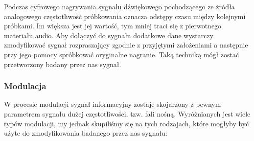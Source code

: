 \documentclass[a4paper,titleauthor]{mwart}
\begin{document}
Podczas cyfrowego nagrywania sygnału dźwiękowego pochodzącego ze źródła analogowego częstotliwość próbkowania oznacza odstępy czasu między kolejnymi próbkami. Im większa jest jej wartość, tym mniej traci się z pierwotnego materiału audio. Aby dołączyć do sygnału dodatkowe dane wystarczy zmodyfikować sygnał rozpraszający zgodnie z przyjętymi założeniami a następnie przy jego pomocy spróbkować oryginalne nagranie. Taką techniką mógł zostać przetworzony badany przez nas sygnał. 

\subsubsection{Modulacja}

W procesie modulacji sygnał informacyjny zostaje skojarzony z pewnym parametrem sygnału dużej częstotliwości, tzw. fali nośną.\newline \newline
Wyróżnianych jest wiele typów modulacji, my jednak skupiliśmy się na tych rodzajach, które mogłyby być użyte do zmodyfikowania badanego przez nas sygnału: 
\end{document}
